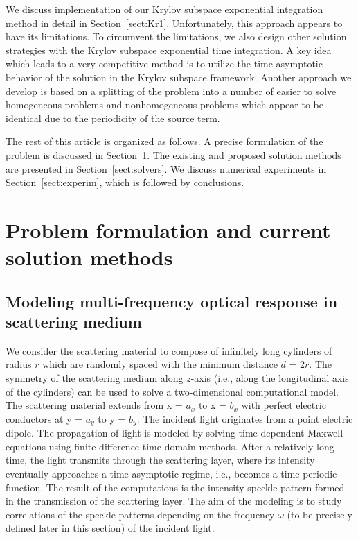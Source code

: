 \documentclass[11pt]{elsarticle}
\begin{document}
We discuss implementation of our Krylov subspace exponential
integration method in detail in Section~\ref{sect:Kr1}. Unfortunately, this approach 
appears to have its limitations. To circumvent the limitations, we also design 
other solution strategies with the Krylov subspace exponential time 
integration. A key idea which leads to a very competitive method is to utilize 
the time asymptotic behavior of the solution in the Krylov subspace framework.
Another approach we develop is based on a splitting of the problem 
into a number of easier to solve homogeneous problems and nonhomogeneous
problems which appear to be identical due to the periodicity of the source term.

The rest of this article is organized as follows.
A precise formulation of the problem is discussed in 
Section~\ref{sect:problem}. The existing and proposed solution methods are 
presented in 
Section~\ref{sect:solvers}. We discuss numerical experiments in 
Section~\ref{sect:experim}, which is followed by conclusions.

\section{Problem formulation and current solution methods}
\label{sect:problem}
\subsection{Modeling multi-frequency optical response in
scattering medium}
We consider the scattering material to compose of infinitely long cylinders of 
radius $r$ which are randomly spaced with the minimum distance $d$ = $2r$. The 
symmetry of the scattering medium along $z$-axis (i.e., along the longitudinal 
axis of the cylinders) can be used to solve a two-dimensional computational 
model. The scattering material extends from x = $a_x$ to x = $b_x$ with perfect 
electric conductors at y = $a_y$ to y = $b_y$. The incident light originates 
from a point electric dipole. The propagation
of light is modeled by solving time-dependent Maxwell 
equations using finite-difference time-domain methods.  After a relatively long 
time, the light transmits through the scattering layer, where its intensity 
eventually approaches a
time asymptotic regime, i.e., becomes a time 
periodic function.  The result of the computations is the 
intensity speckle pattern formed in the transmission of the scattering layer.
The aim of the modeling is to study correlations of the speckle
patterns depending on the frequency $\omega$ (to be precisely defined 
later in this section) of the incident light.
\end{document}
